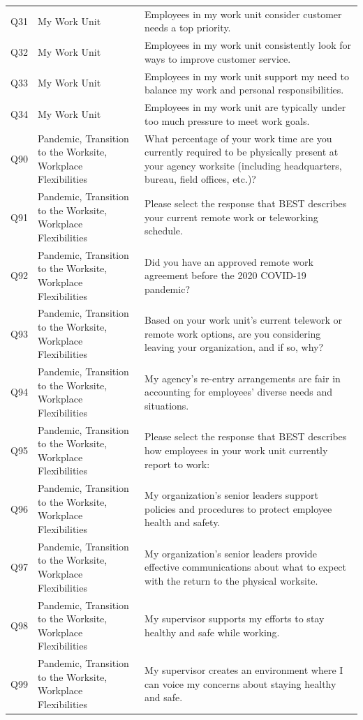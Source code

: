 \documentclass[
  man]{apa7}
\newenvironment{lltable}{\begin{landscape}\centering\begin{ThreePartTable}}{\end{ThreePartTable}\end{landscape}}
\begin{document}
\begin{lltable}
{\begin{longtable}{lll}
Q31 & My Work Unit & Employees in my work unit consider customer needs a top priority.\\
Q32 & My Work Unit & Employees in my work unit consistently look for ways to improve customer service.\\
Q33 & My Work Unit & Employees in my work unit support my need to balance my work and personal responsibilities.\\
Q34 & My Work Unit & Employees in my work unit are typically under too much pressure to meet work goals.\\
Q90 & Pandemic, Transition to the Worksite, Workplace Flexibilities & What percentage of your work time are you currently required to be physically present at your agency worksite (including headquarters, bureau, field offices, etc.)?\\
Q91 & Pandemic, Transition to the Worksite, Workplace Flexibilities & Please select the response that BEST describes your current remote work or teleworking schedule.\\
Q92 & Pandemic, Transition to the Worksite, Workplace Flexibilities & Did you have an approved remote work agreement before the 2020 COVID-19 pandemic?\\
Q93 & Pandemic, Transition to the Worksite, Workplace Flexibilities & Based on your work unit’s current telework or remote work options, are you considering leaving your organization, and if so, why?\\
Q94 & Pandemic, Transition to the Worksite, Workplace Flexibilities & My agency’s re-entry arrangements are fair in accounting for employees’ diverse needs and situations.\\
Q95 & Pandemic, Transition to the Worksite, Workplace Flexibilities & Please select the response that BEST describes how employees in your work unit currently report to work:\\
Q96 & Pandemic, Transition to the Worksite, Workplace Flexibilities & My organization’s senior leaders support policies and procedures to protect employee health and safety.\\
Q97 & Pandemic, Transition to the Worksite, Workplace Flexibilities & My organization’s senior leaders provide effective communications about what to expect with the return to the physical worksite.\\
Q98 & Pandemic, Transition to the Worksite, Workplace Flexibilities & My supervisor supports my efforts to stay healthy and safe while working.\\
Q99 & Pandemic, Transition to the Worksite, Workplace Flexibilities & My supervisor creates an environment where I can voice my concerns about staying healthy and safe.\\
\bottomrule
\end{longtable}

}

\end{lltable}
\end{document}
